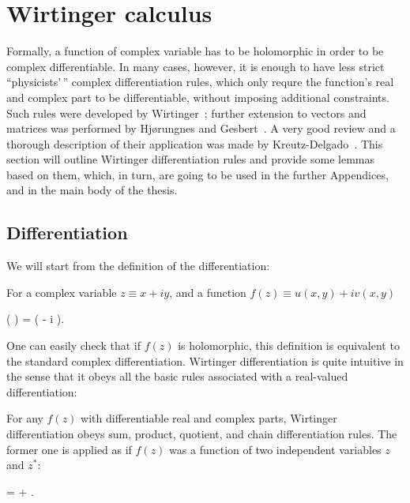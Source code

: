 \chapter{Wirtinger calculus}
\label{cha:appendix:c-numbers}

Formally, a function of complex variable has to be holomorphic in order to be complex differentiable.
In many cases, however, it is enough to have less strict ``physicists'\,'' complex differentiation rules, which only requre the function's real and complex part to be differentiable, without imposing additional constraints.
Such rules were developed by Wirtinger~\cite{Wirtinger1927}; further extension to vectors and matrices was performed by Hj{\o}rungnes and Gesbert~\cite{Hjorungnes2007}.
A very good review and a thorough description of their application was made by Kreutz-Delgado~\cite{Kreutz-Delgado2009}.
This section will outline Wirtinger differentiation rules and provide some lemmas based on them, which, in turn, are going to be used in the further Appendices, and in the main body of the thesis.


\section{Differentiation}

We will start from the definition of the differentiation:

\begin{definition}
\label{def:c-numbers:wirtinger}
	For a complex variable $z \equiv x + iy$, and a function $f(z) \equiv u(x, y) + iv(x, y)$
	\begin{eqn*}
		\left(  \right)
		=  \left(
			 - i 
		\right).
	\end{eqn*}
\end{definition}

One can easily check that if $f(z)$ is holomorphic, this definition is equivalent to the standard complex differentiation.
Wirtinger differentiation is quite intuitive in the sense that it obeys all the basic rules associated with a real-valued differentiation:

\begin{theorem}
\label{thm:c-numbers:diff-properties}
	For any $f(z)$ with differentiable real and complex parts, Wirtinger differentiation obeys sum, product, quotient, and chain differentiation rules.
	The former one is applied as if $f(z)$ was a function of two independent variables $z$ and $z^*$:
	\begin{eqn*}
		\frac{\upd f(g(z))}{\upd z}
		=  \frac{\upd g}{\upd z}
			+  \frac{\upd g^*}{\upd z}.
	\end{eqn*}
\end{theorem}

